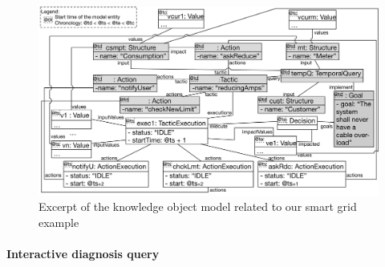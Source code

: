 


%

\begin{figure}
	\centering
	\includegraphics[width=.6\linewidth]{img/chapt-tkm/validation/action-om}
	\caption{Excerpt of the knowledge object model related to our smart grid example}
	\label{fig:action-om}
\end{figure}

\paragraph{\textbf{Interactive diagnosis query}}

